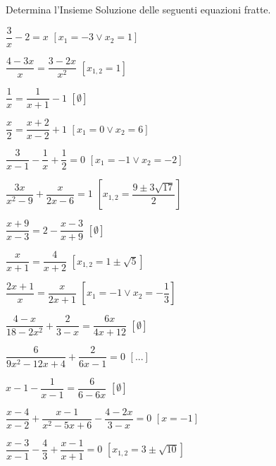 \subsection*{}

\begin{esercizio}[\Ast]
\label{ese:3.39}
Determina l'Insieme Soluzione delle seguenti equazioni fratte.
\begin{multicols}{2}
\begin{enumeratea}
\item\(\dfrac{3}{x}-2 = x\)
  \hfill\(\left[x_{1} =-3 \vee x_{2} = 1\right]\)
\item\(\dfrac{4-3 x}{x}=\dfrac{3-2 x}{x^{2}}\)
  \hfill\(\left[x_{1,2}= 1\right]\)
\item\(\dfrac{1}{x} = \dfrac{1}{x + 1}-1\)
  \hfill\(\left[\emptyset\right]\)
\item\(\dfrac{x}{2} = \dfrac{x + 2}{x-2} + 1\)
  \hfill\(\left[x_{1} = 0 \vee x_{2} = 6\right]\)
\item\(\dfrac{3}{x-1}-\dfrac{1}{x} + \dfrac{1}{2} = 0\)
  \hfill\(\left[x_{1} =-1 \vee x_{2} =-2\right]\)
\item\(\dfrac{3 x}{x^{2}-9} + \dfrac{x}{2 x-6}=1\)
  \hfill\(\left[x_{1,2} = \dfrac{9 \pm 3 \sqrt{17}}{2}\right]\)
\item\(\dfrac{x + 9}{x-3}=2-\dfrac{x-3}{x + 9}\)
  \hfill\(\left[\emptyset\right]\)
\item\(\dfrac{x}{x + 1} = \dfrac{4}{x + 2}\)
  \hfill\(\left[x_{1,2} = 1 \pm \sqrt{5}\right]\)
\item\(\dfrac{2 x + 1}{x} = \dfrac{x}{2 x + 1}\)
  \hfill\(\left[x_{1} =-1 \vee x_{2} =-\dfrac{1}{3}\right]\)
\item\(\dfrac{4-x}{18-2 x^{2}} + \dfrac{2}{3-x} = \dfrac{6 x}{4 x +12}\)
  \hfill\(\left[\emptyset\right]\)
\item\(\dfrac{6}{9 x^{2}-12 x + 4} + \dfrac{2}{6x -1} =0\)
  \hfill\(\left[...\right]\)
\item\(x-1-\dfrac{1}{x-1} = \dfrac{6}{6-6 x}\)
  \hfill\(\left[\emptyset\right]\)
\item\(\dfrac{x-4}{x-2} + \dfrac{x-1}{x^{2}-5 x + 6}-\dfrac{4 -2 x}{3-x} = 0\)
  \hfill\(\left[x =-1\right]\)
\item\(\dfrac{x-3}{x-1}-\dfrac{4}{3} + \dfrac{x-1}{x + 1}=0\)
  \hfill\(\left[x_{1,2} = 3 \pm \sqrt{10}\right]\)
\end{enumeratea}
\end{multicols}
\end{esercizio}

